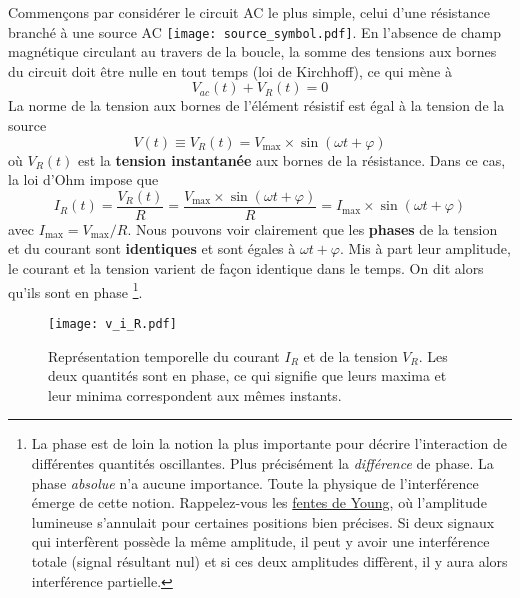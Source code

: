 \documentclass[titlepage,oneside,a4paper,11pt]{book} %
\begin{document}
Commençons par considérer le circuit AC le plus simple, celui d'une résistance branché à une source AC \texttt{[image: source\_symbol.pdf]}. En l'absence de champ magnétique circulant au travers de la boucle,  la somme des tensions aux bornes du circuit doit être nulle en tout temps (loi de Kirchhoff), ce qui mène à
\begin{equation*}
V_{ac}(t) + V_R(t) = 0 
\end{equation*}
La norme de la tension aux bornes de l'élément résistif est égal à la tension de la source
\begin{equation*}
V(t) \equiv V_R(t) = V_{\mathrm{max}} \times \sin (\omega t+\varphi)
\end{equation*}
où $V_R(t)$ est la \textbf{tension instantanée} aux bornes de la résistance.  Dans ce cas, la loi d'Ohm impose que
\begin{equation}
I_R(t) = \frac{V_R(t)}{R} = \frac{V_{\mathrm{max}}\times \sin (\omega t+\varphi)}{R} = I_{\mathrm{max}}\times\sin (\omega t + \varphi)
\end{equation}
avec $I_{\mathrm{max}}=V_{\mathrm{max}}/R$. Nous pouvons voir clairement que les \textbf{phases} de la tension et du courant sont \textbf{identiques} et sont égales à $\omega t+\varphi$.  Mis à part leur amplitude, le courant et la tension varient de façon identique dans le temps.  On dit alors qu'ils sont en phase \footnote{La phase est de loin la notion la plus importante pour décrire l'interaction de différentes quantités oscillantes. Plus précisément la \emph{différence} de phase. La phase \emph{absolue} n'a aucune importance.  Toute la physique de l'interférence émerge de cette notion. Rappelez-vous les \href{https://en.wikipedia.org/wiki/Double-slit_experiment}{fentes de Young}, où l'amplitude lumineuse s'annulait pour certaines positions bien précises. Si deux signaux qui interfèrent possède la même amplitude, il peut y avoir une interférence totale (signal résultant nul) et si ces deux amplitudes diffèrent, il y aura alors interférence partielle.}.\\

\begin{wrapfigure}{r}{0.5\textwidth}
  \begin{center}
    \texttt{[image: v\_i\_R.pdf]}
    \caption{Représentation temporelle du courant $I_R$ et de la tension $V_R$.  Les deux quantités sont en phase, ce qui signifie que leurs maxima et leur minima correspondent aux mêmes instants.}
    \label{fig:i_v_R_time}
  \end{center}
\end{wrapfigure}
\end{document}
